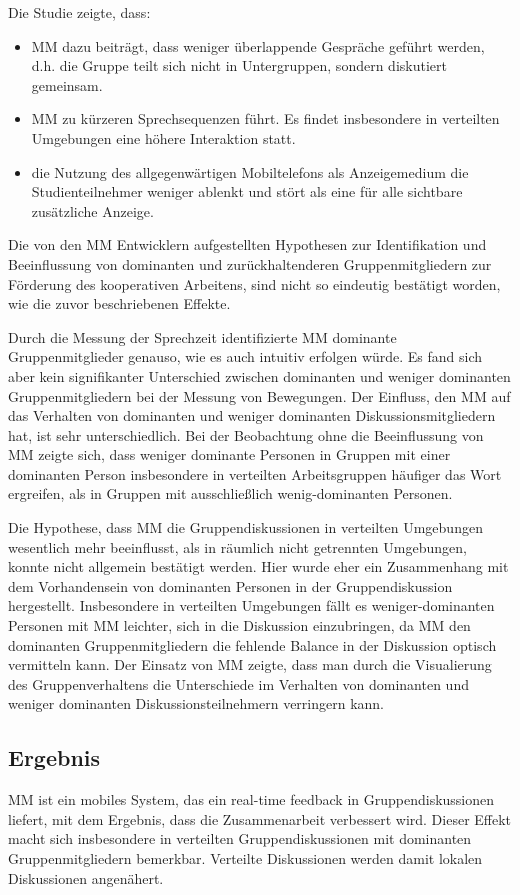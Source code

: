Die Studie zeigte, dass:

\begin{itemize}
  \item MM dazu beiträgt, dass weniger überlappende Gespräche geführt werden, d.h. die
Gruppe teilt sich nicht in Untergruppen, sondern diskutiert gemeinsam.
  \item MM zu kürzeren Sprechsequenzen führt. Es findet insbesondere in verteilten
Umgebungen eine höhere Interaktion statt.
  \item die Nutzung des allgegenwärtigen Mobiltelefons als Anzeigemedium die
Studienteilnehmer weniger ablenkt und stört als eine für alle sichtbare
zusätzliche Anzeige.

\end{itemize}

Die von den MM Entwicklern aufgestellten Hypothesen zur Identifikation und
Beeinflussung von dominanten und zurückhaltenderen Gruppenmitgliedern zur
Förderung des kooperativen Arbeitens, sind nicht so eindeutig bestätigt worden,
wie die zuvor beschriebenen Effekte.

Durch die Messung der Sprechzeit identifizierte MM dominante Gruppenmitglieder
genauso, wie es auch intuitiv erfolgen würde. Es fand sich aber kein
signifikanter Unterschied zwischen dominanten und weniger dominanten
Gruppenmitgliedern bei der Messung von Bewegungen.
Der Einfluss, den MM auf das Verhalten von dominanten und weniger dominanten
Diskussionsmitgliedern hat, ist sehr unterschiedlich.
Bei der Beobachtung ohne die Beeinflussung von MM zeigte sich, dass weniger
dominante Personen in Gruppen mit einer dominanten Person insbesondere in
verteilten Arbeitsgruppen häufiger das Wort ergreifen, als in Gruppen mit
ausschließlich wenig-do\-min\-ant\-en Personen.

Die Hypothese, dass MM die Gruppendiskussionen in verteilten Umgebungen
wesentlich mehr beeinflusst, als in räumlich nicht getrennten Umgebungen, konnte
nicht allgemein bestätigt werden. Hier wurde eher ein Zusammenhang mit dem
Vorhandensein von dominanten Personen in der Gruppendiskussion hergestellt.
Insbesondere in verteilten Umgebungen fällt es weniger-dominanten Personen mit
MM leichter, sich in die Diskussion einzubringen, da MM den dominanten
Gruppenmitgliedern die fehlende Balance in der Diskussion optisch vermitteln
kann. 
Der Einsatz von MM zeigte, dass man durch die Visualierung des Gruppenverhaltens
die Unterschiede im Verhalten von dominanten und weniger dominanten
Diskussionsteilnehmern verringern kann.

\subsection{Ergebnis}
MM ist ein mobiles System, das ein real-time feedback in Gruppendiskussionen
liefert, mit dem Ergebnis, dass die Zusammenarbeit verbessert wird.
Dieser Effekt macht sich insbesondere in verteilten Gruppendiskussionen mit
dominanten Gruppenmitgliedern bemerkbar. Verteilte Diskussionen werden damit
lokalen Diskussionen angenähert.


